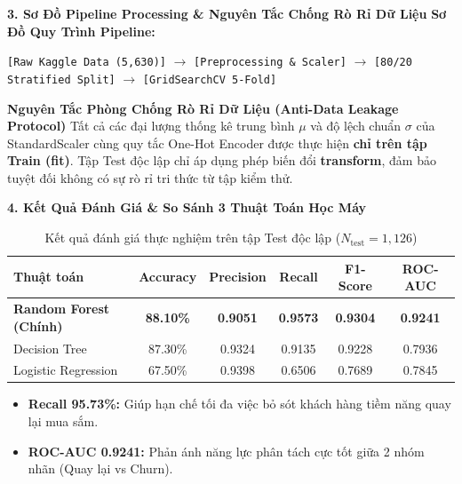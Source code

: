 \documentclass[10pt, aspectratio=169]{beamer}
\begin{document}
\begin{frame}{\textbf{3. Sơ Đồ Pipeline Processing \& Nguyên Tắc Chống Rò Rỉ Dữ Liệu}}
    \textbf{Sơ Đồ Quy Trình Pipeline:}
    \begin{center}
        \small
        \texttt{[Raw Kaggle Data (5,630)]} $\to$ \texttt{[Preprocessing \& Scaler]} $\to$ \texttt{[80/20 Stratified Split]} $\to$ \texttt{[GridSearchCV 5-Fold]}
    \end{center}

    \vspace{0.3cm}
    \begin{alertblock}{\textbf{Nguyên Tắc Phòng Chống Rò Rỉ Dữ Liệu (Anti-Data Leakage Protocol)}}
        Tất cả các đại lượng thống kê trung bình $\mu$ và độ lệch chuẩn $\sigma$ của StandardScaler cùng quy tắc One-Hot Encoder được thực hiện \textbf{chỉ trên tập Train (fit)}. Tập Test độc lập chỉ áp dụng phép biến đổi \textbf{transform}, đảm bảo tuyệt đối không có sự rò rỉ tri thức từ tập kiểm thử.
    \end{alertblock}
\end{frame}

\begin{frame}{\textbf{4. Kết Quả Đánh Giá \& So Sánh 3 Thuật Toán Học Máy}}
    \begin{table}
        \centering
        \caption{Kết quả đánh giá thực nghiệm trên tập Test độc lập ($N_{\text{test}} = 1,126$)}
        \begin{tabular}{lccccc}
            \toprule
            \textbf{Thuật toán} & \textbf{Accuracy} & \textbf{Precision} & \textbf{Recall} & \textbf{F1-Score} & \textbf{ROC-AUC} \\
            \midrule
            \textbf{Random Forest (Chính)} & \textbf{88.10\%} & \textbf{0.9051} & \textbf{0.9573} & \textbf{0.9304} & \textbf{0.9241} \\
            Decision Tree & 87.30\% & 0.9324 & 0.9135 & 0.9228 & 0.7936 \\
            Logistic Regression & 67.50\% & 0.9398 & 0.6506 & 0.7689 & 0.7845 \\
            \bottomrule
        \end{tabular}
    \end{table}

    \vspace{0.2cm}
    \begin{itemize}
        \item \textbf{Recall 95.73\%:} Giúp hạn chế tối đa việc bỏ sót khách hàng tiềm năng quay lại mua sắm.
        \item \textbf{ROC-AUC 0.9241:} Phản ánh năng lực phân tách cực tốt giữa 2 nhóm nhãn (Quay lại vs Churn).
    \end{itemize}
\end{frame}
\end{document}
